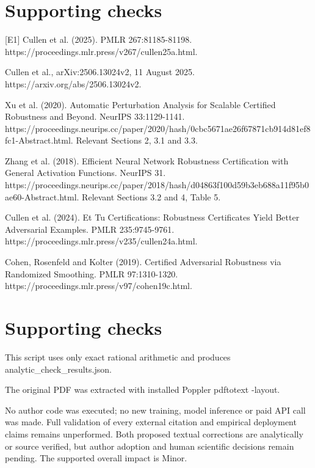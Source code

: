 \documentclass[10pt]{article}
\begin{document}
\section*{Supporting checks}
[E1] Cullen et al. (2025). PMLR 267:81185-81198. https://proceedings.mlr.press/v267/cullen25a.html.\par
Cullen et al., arXiv:2506.13024v2, 11 August 2025. https://arxiv.org/abs/2506.13024v2.\par
Xu et al. (2020). Automatic Perturbation Analysis for Scalable Certified Robustness and Beyond. NeurIPS 33:1129-1141. https://proceedings.neurips.cc/paper/2020/hash/0cbc5671ae26f67871cb914d81ef8fc1-Abstract.html. Relevant Sections 2, 3.1 and 3.3.\par
Zhang et al. (2018). Efficient Neural Network Robustness Certification with General Activation Functions. NeurIPS 31. https://proceedings.neurips.cc/paper/2018/hash/d04863f100d59b3eb688a11f95b0ae60-Abstract.html. Relevant Sections 3.2 and 4, Table 5.\par
Cullen et al. (2024). Et Tu Certifications: Robustness Certificates Yield Better Adversarial Examples. PMLR 235:9745-9761. https://proceedings.mlr.press/v235/cullen24a.html.\par
Cohen, Rosenfeld and Kolter (2019). Certified Adversarial Robustness via Randomized Smoothing. PMLR 97:1310-1320. https://proceedings.mlr.press/v97/cohen19c.html.\par
\section*{Supporting checks}
This script uses only exact rational arithmetic and produces analytic\_check\_results.json.\par
The original PDF was extracted with installed Poppler pdftotext -layout.\par
No author code was executed; no new training, model inference or paid API call was made. Full validation of every external citation and empirical deployment claims remains unperformed. Both proposed textual corrections are analytically or source verified, but author adoption and human scientific decisions remain pending. The supported overall impact is Minor.\par
\end{document}
